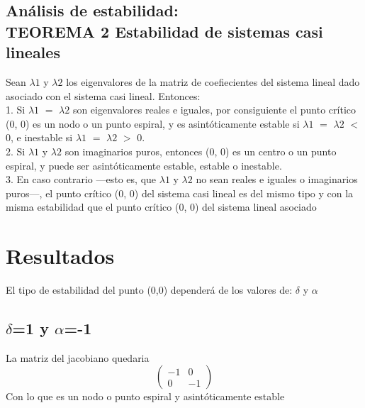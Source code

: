 \documentclass{article}
\begin{document}
  \noindent
    \subsection*{Análisis de estabilidad: \\ TEOREMA 2 Estabilidad de sistemas casi lineales}
      
      Sean $\lambda1$ y $\lambda2$ los eigenvalores de la matriz de coefiecientes del sistema lineal dado 
      asociado con el sistema casi lineal. Entonces:\\
      1. Si  $\lambda1$ $=$ $\lambda2$ son eigenvalores reales e iguales, por consiguiente el punto crítico 
      (0, 0)  es un nodo o un punto espiral, y es asintóticamente estable si $\lambda1$
      $=$  $\lambda2$ $<$ 0, e inestable si $\lambda1$ $=$  $\lambda2$ $>$ 0.\\
      2. Si $\lambda1$ y $\lambda2$  son imaginarios puros, entonces (0, 0) es un centro o un punto espiral, 
      y puede ser asintóticamente estable, estable o inestable.\\

      3. En caso contrario —esto es, que  $\lambda1$ y  $\lambda2$ no sean reales e iguales o imaginarios 
      puros—, el punto crítico (0, 0) del sistema casi lineal  es del mismo 
      tipo y con la misma estabilidad que el punto crítico (0, 0) del sistema lineal 
      asociado

    \section{Resultados}
       El tipo de estabilidad del punto (0,0) dependerá de los valores de: $\delta$ y $\alpha$
       \subsection{$\delta$=1 y $\alpha$=-1} 
         La matriz del jacobiano quedaria
         \[
          \left(
          \begin{array}{lc}
            -1 & 0\\
            0 & -1
          \end{array}
          \right)
          \]         
          Con lo que es un nodo o punto espiral y asintóticamente estable 
\end{document}
